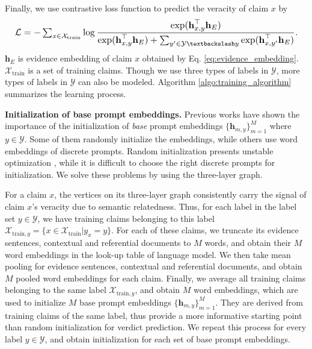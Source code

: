 Finally, we use contrastive loss function to predict the veracity of claim $ x $ by
\begin{equation}
\label{eq:objective_function}
\resizebox{\columnwidth}{!}{
    $ \mathcal{L}=-\sum_{x\in\mathcal{X}_{\text{train}}}\log\dfrac{\exp(\textbf{h}_{x,y}^\top\textbf{h}_E)}{\exp(\textbf{h}_{x,y}^\top\textbf{h}_E)+\sum_{y^\prime\in\mathcal{Y}\textbackslash y}\exp(\textbf{h}_{x,y^\prime}^\top\textbf{h}_E)}. $
}
\end{equation}
$ \textbf{h}_E $ is evidence embedding of claim $ x $ obtained by Eq. \ref{eq:evidence_embedding}. $ \mathcal{X}_{\text{train}} $ is a set of training claims. Though we use three types of labels in $ \mathcal{Y} $, more types of labels in $ \mathcal{Y} $ can also be modeled. Algorithm \ref{algo:training_algorithm} summarizes the learning process.

\textbf{Initialization of base prompt embeddings.} Previous works \cite{coop} have shown the importance of the initialization of \emph{base} prompt embeddings $ \{\textbf{h}_{m,y}\}_{m=1}^M $ where $ y\in\mathcal{Y} $. Some of them randomly initialize the embeddings, while others use word embeddings of discrete prompts. Random initialization presents unstable optimization \cite{g2p2}, while it is difficult to choose the right discrete prompts for initialization. We solve these problems by using the three-layer graph.

For a claim $ x $, the vertices on its three-layer graph consistently carry the signal of claim $ x $'s veracity due to semantic relatedness. Thus, for each label in the label set $ y\in\mathcal{Y} $, we have training claims belonging to this label $ \mathcal{X}_{\text{train},y}=\{x\in\mathcal{X}_{\text{train}}|y_x=y\} $. For each of these claims, we truncate its evidence sentences, contextual and referential documents to $ M $ words, and obtain their $ M $ word embeddings in the look-up table of language model. We then take mean pooling for evidence sentences, contextual and referential documents, and obtain $ M $ pooled word embeddings for each claim. Finally, we average all training claims belonging to the same label $ \mathcal{X}_{\text{train},y} $, and obtain $ M $ word embeddings, which are used to initialize $ M $ base prompt embeddings $ \{\textbf{h}_{m,y}\}_{m=1}^M $. They are derived from training claims of the same label, thus provide a more informative starting point than random initialization for verdict prediction. We repeat this process for every label $ y\in\mathcal{Y} $, and obtain initialization for each set of base prompt embeddings.
